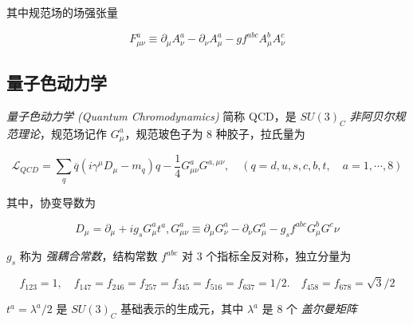 其中规范场的场强张量

\begin{equation}
    F_{\mu\nu}^a \equiv \partial_\mu A_\nu^a - \partial_\nu A_\mu^a - g f^{abc} A_\mu^b A_\nu^c
\end{equation}

\subsection{量子色动力学}

\emph{量子色动力学 (Quantum Chromodynamics)} 简称 QCD，是 $SU(3)_C$ \emph{非阿贝尔规范理论}，规范场记作 $G_\mu^a$，规范玻色子为 $8$ 种胶子，拉氏量为

\begin{equation}
    \mathcal{L}_{QCD} = \sum_q \overline{q} (i \gamma^\mu D_\mu - m_q)q - \frac{1}{4} G_{\mu\nu}^a G^{a, \mu\nu}, \quad (q = d, u, s, c, b, t, \quad a = 1, \cdots, 8)
\end{equation}

其中，协变导数为

\begin{equation}
    D_\mu = \partial_\mu + i g_s G^a_\mu t^a, G^a_{\mu\nu} \equiv \partial_\mu G^a_{\nu} - \partial_\nu G^a_\mu - g_s f^{abc}G^b_\mu G^c\nu
\end{equation}

$g_s$ 称为 \emph{强耦合常数}，结构常数 $f^{abc}$ 对 $3$ 个指标全反对称，独立分量为

\begin{equation}
    f_{123} = 1, \quad f_{147} = f_{246} = f_{257} = f_{345} = f_{516} = f_{637} = 1/2. \quad f_{458} = f_{678} = \sqrt{3}/2
\end{equation}

$t^a = \lambda^a / 2$ 是 $SU(3)_C$ 基础表示的生成元，其中 $\lambda^a$ 是 $8$ 个 \emph{盖尔曼矩阵}

